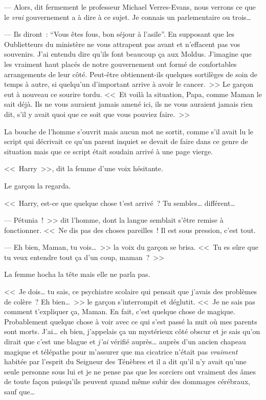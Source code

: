 --- Alors, dit fermement le professeur Michael Verres-Evans, nous verrons ce que le \emph{vrai} gouvernement a à dire à ce sujet. Je connais un parlementaire ou trois…

--- Ils diront~: “Vous êtes fous, bon séjour à l'asile”. En supposant que les Oublietteurs du ministère ne vous attrapent pas avant et n'effacent pas vos souvenirs. J'ai entendu dire qu'ils font beaucoup ça aux Moldus. J'imagine que les vraiment haut placés de notre gouvernement ont formé de confortables arrangements de leur côté. Peut-être obtiennent-ils quelques sortilèges de soin de temps à autre, si quelqu'un d'important arrive à avoir le cancer.~>> Le garçon eut à nouveau ce sourire tordu. <<~Et voilà la situation, Papa, comme Maman le sait déjà. Ils ne vous auraient jamais amené ici, ils ne vous auraient jamais rien dit, s'il y avait quoi que ce soit que vous pouviez faire.~>>

La bouche de l'homme s'ouvrit mais aucun mot ne sortit, comme s'il avait lu le script qui décrivait ce qu'un parent inquiet se devait de faire dans ce genre de situation mais que ce script était soudain arrivé à une page vierge.

<<~Harry~>>, dit la femme d'une voix hésitante.

Le garçon la regarda.

<<~Harry, est-ce que quelque chose t'est arrivé~? Tu sembles… différent…

--- Pétunia~!~>> dit l'homme, dont la langue semblait s'être remise à fonctionner. <<~Ne dis pas des choses pareilles~! Il est sous pression, c'est tout.

--- Eh bien, Maman, tu vois…~>> la voix du garçon se brisa. <<~Tu es sûre que tu veux entendre tout ça d'un coup, maman~?~>>

La femme hocha la tête mais elle ne parla pas.

<<~Je dois… tu sais, ce psychiatre scolaire qui pensait que j'avais des problèmes de colère~? Eh bien…~>> le garçon s'interrompit et déglutit. <<~Je ne sais pas comment t'expliquer ça, Maman. En fait, c'est quelque chose de magique. Probablement quelque chose à voir avec ce qui s'est passé la nuit où mes parents sont morts. J'ai… eh bien, j'appelais ça un mystérieux côté obscur et je sais qu'on dirait que c'est une blague et \emph{j'ai} vérifié auprès… auprès d'un ancien chapeau magique et télépathe pour m'assurer que ma cicatrice n'était pas \emph{vraiment} habitée par l'esprit du Seigneur des Ténèbres et il a dit qu'il n'y avait qu'une seule personne sous lui et je ne pense pas que les sorciers ont vraiment des âmes de toute façon puisqu'ils peuvent quand même subir des dommages cérébraux, sauf que…

